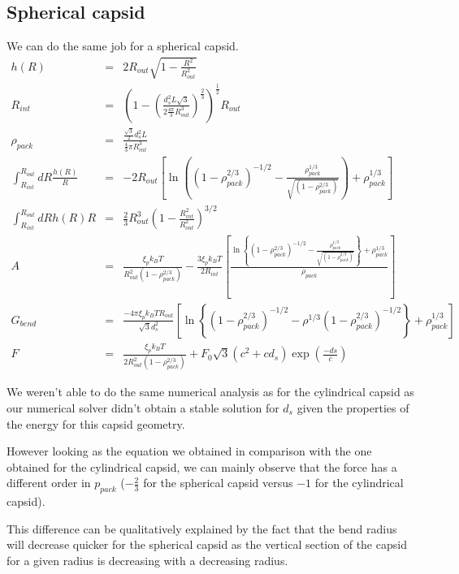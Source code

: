 \documentclass{article}
\begin{document}
\subsection{Spherical capsid}
We can do the same job for a spherical capsid.
\begin{eqnarray}
    h(R) &=& 2 R_{out} \sqrt{1 - \frac{R^2}{R_{out}^2}}\\
    R_{int} &=& \left(1 - \left( \frac{d_s^2 L \sqrt{3}}{2 \frac{4\pi}{3} R_{out}^3} \right) ^{\frac{2}{3}}\right)^{\frac{1}{2}} R_{out} \\
    \rho_{pack} &=& \frac{\frac{\sqrt{3}}{2} d_s^2 L}{\frac{4}{3} \pi R_{int}^3} \\
    \int_{R_{int}}^{R_{out}} dR \frac{h(R)}{R} & = & -2 R_{out} \left[ \ln \left( \left( 1 - \rho_{pack}^{2/3}\right)^{-1/2} - \frac{\rho_{pack}^{1/3}}{\sqrt{ \left(1 - \rho_{pack}^{2/3}\right)}} \right) + \rho_{pack}^{1/3} \right] \\
    \int_{R_{int}}^{R_{out}} dR h(R) R &=& \frac{2}{3} R_{out}^3 \left( 1 - \frac{R_{int}^2}{R_{out}^2} \right)^{3/2} \\
    A &=& \frac{\xi_{p} k_B T }{R_{out}^2 \left( 1 - \rho_{pack}^{2/3} \right)} - \frac{3 \xi_p k_B T}{2 R_{int}} \left[ \frac{ \ln \left\{ \left(  1 - \rho_{pack}^{2/3} \right)^{-1/2} - \frac{\rho_{pack}^{1/3}}{\sqrt{ \left(1 - \rho_{pack}^{2/3}\right)}} \right\} + \rho_{pack}^{1/3}}{\rho_{pack}} \right] \\
    G_{bend} &=& \frac{-4 \pi \xi_p k_B T R_{out}}{\sqrt{3} d_s^2} \left[ \ln \left\{ \left( 1 - \rho_{pack}^{2/3} \right)^{-1/2} - \rho^{1/3} \left( 1 - \rho_{pack}^{2/3} \right)^{-1/2} \right\} + \rho_{pack}^{1/3} \right] \\
    F &=& \frac{ \xi_p k_B T}{2 R_{out}^2 \left( 1 - \rho_{pack}^{2/3} \right) } + F_0 \sqrt{3} \left( c^2 + c d_s \right) \exp \left( \frac{-ds}{c} \right)
\end{eqnarray}

We weren't able to do the same numerical analysis as for the cylindrical capsid as our numerical solver didn't obtain a stable solution for $d_s$ given the properties of the energy for this capsid geometry.

However looking as the equation we obtained in comparison with the one obtained for the cylindrical capsid, we can mainly observe that the force has a different order in $p_{pack}$ ($-\frac{2}{3}$ for the spherical capsid versus $-1$ for the cylindrical capsid).

This difference can be qualitatively explained by the fact that the bend radius will decrease quicker for the spherical capsid as the vertical section of the capsid for a given radius is decreasing with a decreasing radius.
\end{document}
